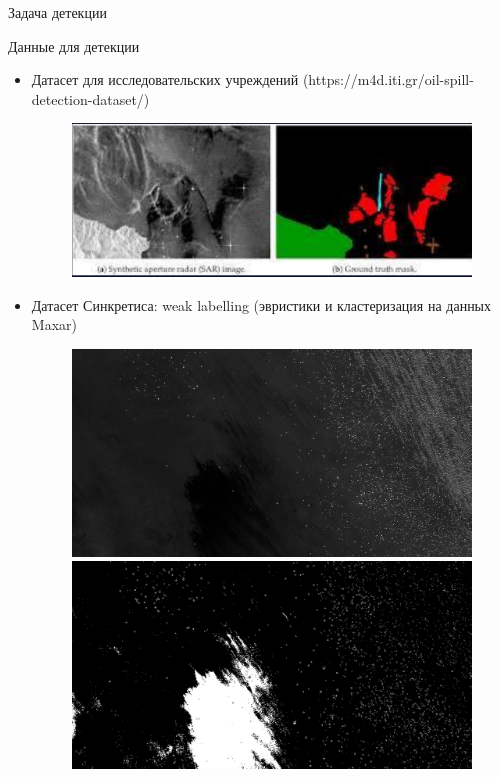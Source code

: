 \documentclass{beamer}
\begin{document}
\begin{section}{Задача детекции}
	\begin{frame}{Данные для детекции}
	\begin{itemize}
		\item Датасет для исследовательских учреждений (https://m4d.iti.gr/oil-spill-detection-dataset/)
		
		\begin{figure}[H]
			\centering
			\includegraphics[scale=0.2]{greek_dataset_example.png}
		\end{figure}
		
		\item Датасет Синкретиса: weak labelling (эвристики и кластеризация на данных Maxar)
		
		\begin{figure}
			\centering
			\begin{minipage}{0.5\textwidth}
			\includegraphics[scale=0.1]{maxar_8thAugust_1_26_28.png}
			\end{minipage}%
		    \begin{minipage}{0.5\textwidth}
		    \includegraphics[scale=0.1]{maxar_8thAugust_1_26_28_mask.png}
		    \end{minipage}
	    \end{figure}
	

\end{itemize}
\end{frame}
\end{section}
\end{document}
